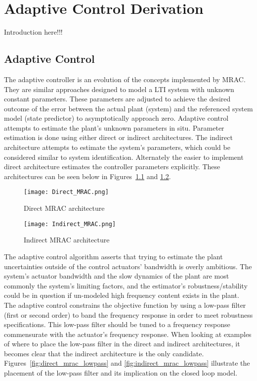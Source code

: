 \chapter{\Lone Adaptive Control Derivation}\label{ch:derivation}

Introduction here!!!

\section{\Lone Adaptive Control}
The \Lone adaptive controller is an evolution of the concepts implemented by \ac{MRAC}.  They are similar approaches designed to model a \ac{LTI} system with unknown constant parameters.  These parameters are adjusted to achieve the desired outcome of the error between the actual plant (system) and the referenced system model (state predictor) to asymptotically approach zero.   Adaptive control attempts to estimate the plant's unknown parameters in situ.  Parameter estimation is done using either direct or indirect architectures.  The indirect architecture attempts to estimate the system's parameters, which could be considered similar to  system identification.  Alternately the easier to implement direct architecture estimates the controller parameters explicitly.  These architectures can be seen below in Figures~\ref{fig:direct_mrac} and \ref{fig:indirect_mrac}.

\begin{figure}[h!]
 \centering
  \texttt{[image: Direct\_MRAC.png]}
  \caption{Direct \ac{MRAC} architecture }
  \label{fig:direct_mrac}
\end{figure}

\begin{figure}[h!]
 \centering
  \texttt{[image: Indirect\_MRAC.png]}
  \caption{Indirect \ac{MRAC} architecture }
  \label{fig:indirect_mrac}
\end{figure}

The \Lone adaptive control algorithm asserts that trying to estimate the plant uncertainties outside of the control actuators' bandwidth is overly ambitious.  The system's actuator bandwidth and the slow dynamics of the plant are most commonly the system's limiting factors, and the estimator's robustness/stability could be in question if un-modeled high frequency content exists in the plant.  %
The \Lone adaptive control constrains the objective function by using a low-pass filter (first or second order) to band the frequency response in order to meet robustness specifications.  This low-pass filter should be tuned to a frequency response commensurate with the actuator's frequency response.  When looking at examples of where to place the low-pass filter in the direct and indirect architectures, it becomes clear that the indirect architecture is the only candidate.  Figures~\ref{fig:direct_mrac_lowpass} and \ref{fig:indirect_mrac_lowpass} illustrate the placement of the low-pass filter and its implication on the closed loop model. 

